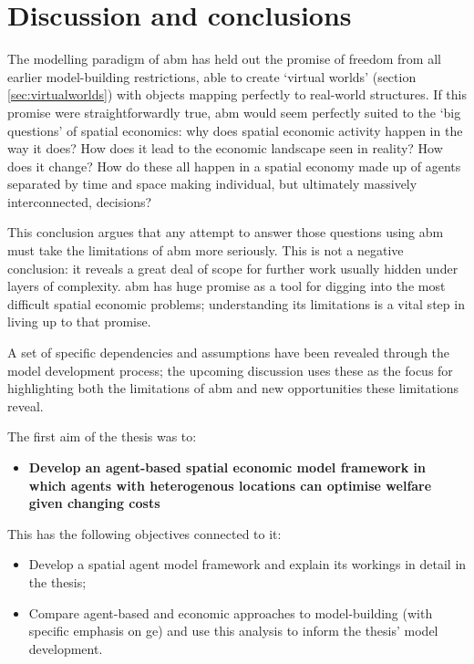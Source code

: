 \chapter{Discussion and conclusions \label{chapter:conc}} 

The modelling paradigm of \gls{abm} has held out the promise of freedom from all earlier model-building restrictions, able to create `virtual worlds' (section \ref{sec:virtualworlds}) with objects mapping perfectly to real-world structures. If this promise were straightforwardly true, \gls{abm} would seem perfectly suited to the `big questions' of spatial economics: why does spatial economic activity happen in the way it does? How does it lead to the economic landscape seen in reality? How does it change? How do these all happen in a spatial economy made up of agents separated by time and space making individual, but ultimately massively interconnected, decisions?

This conclusion argues that any attempt to answer those questions using \gls{abm} must take the limitations of \gls{abm} more seriously. This is not a negative conclusion: it reveals a great deal of scope for further work usually hidden under layers of complexity. \gls{abm} has huge promise as a tool for digging into the most difficult spatial economic problems; understanding its limitations is a vital step in living up to that promise.

A set of specific dependencies and assumptions have been revealed through the model development process; the upcoming discussion uses these as the focus for highlighting both the limitations of \gls{abm} and new opportunities these limitations reveal. 

The first aim of the thesis was to:

\begin{itemize}
\item \textbf{Develop an agent-based spatial economic model framework in which agents with heterogenous locations can optimise welfare given changing costs}
\end{itemize}

This has the following objectives connected to it:

\begin{itemize}
	\item Develop a spatial agent model framework and explain its workings in detail in the thesis;
	\item Compare agent-based and economic approaches to model-building (with specific emphasis on \gls{ge}) and use this analysis to inform the thesis' model development.
\end{itemize}

